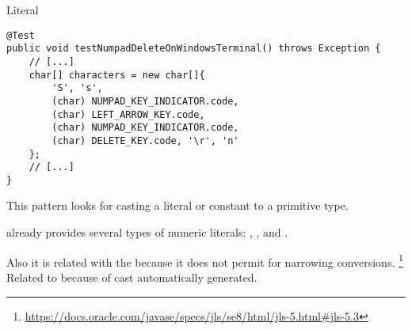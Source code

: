 \begin{pattern}{Literal}
\begin{verbatim}
@Test
public void testNumpadDeleteOnWindowsTerminal() throws Exception {
    // [...]
    char[] characters = new char[]{
        'S', 's',
        (char) NUMPAD_KEY_INDICATOR.code,
        (char) LEFT_ARROW_KEY.code,
        (char) NUMPAD_KEY_INDICATOR.code,
        (char) DELETE_KEY.code, '\r', 'n'
    };
    // [...]
}
\end{verbatim}

\detection{}
This pattern looks for casting a literal or constant to a primitive type.

\discussion{}
\java{} already provides several types of numeric literals:
, ,  and .

\related{}
%
%
Also it is related with the 
because it does not permit for narrowing conversions.%
\footnote{\url{https://docs.oracle.com/javase/specs/jls/se8/html/jls-5.html\#jls-5.3}}
%
%
Related to  because of cast automatically generated.
\end{pattern}